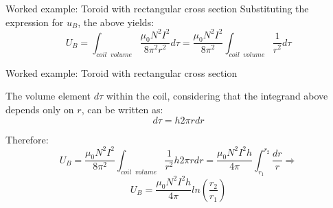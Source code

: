 {\begin{frame}{Worked example: Toroid with rectangular cross section}
  Substituting the expression for $u_B$, the above yields:
  \begin{equation*}
    U_B = \int_{coil\;\;volume} \frac{\mu_0 N^2 I^2}{8\pi^2 r^2} d\tau
        = \frac{\mu_0 N^2 I^2}{8\pi^2} \int_{coil\;\;volume} \frac{1}{r^2} d\tau
  \end{equation*}

\end{frame}

%
%
%

\begin{frame}{Worked example: Toroid with rectangular cross section}

  The volume element $d\tau$ within the coil, considering that the integrand
  above depends only on $r$, can be written as:
  \begin{equation*}
    d\tau = h 2\pi r dr
  \end{equation*}

  Therefore:
  \begin{equation*}
    U_B = \frac{\mu_0 N^2 I^2}{8\pi^2} \int_{coil\;\;volume} \frac{1}{r^2} h 2\pi r dr
        = \frac{\mu_0 N^2 I^2 h}{4\pi} \int_{r_1}^{r_2} \frac{dr}{r} \Rightarrow
  \end{equation*}
  \begin{equation*}
    U_B = \frac{\mu_0 N^2 I^2 h}{4\pi} ln(\frac{r_2}{r_1})
  \end{equation*}

\end{frame}

} %
